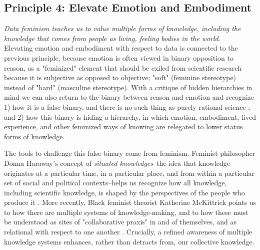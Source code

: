 \subsection{Principle 4: Elevate Emotion and Embodiment}

\textit{Data feminism teaches us to value multiple forms of knowledge, including the knowledge that comes from people as living, feeling bodies in the world.}
\\[5pt]
Elevating emotion and embodiment with respect to data is connected to the previous principle, because emotion is often viewed in binary opposition to reason, as a "feminized" element that should be exiled from scientific research because it is subjective as opposed to objective; "soft" (feminine stereotype) instead of "hard" (masculine stereotype). With a critique of hidden hierarchies in mind we can also return to the binary between reason and emotion and recognize 1) how it is a false binary, and there is no such thing as purely rational science \cite{Keller_1996}; and 2) how this binary is hiding a hierarchy, in which emotion, embodiment, lived experience, and other feminized ways of knowing are relegated to lower status forms of knowledge. 

The tools to challenge this false binary come from feminism. Feminist philosopher Donna Haraway’s concept of \textit{situated knowledges}–the idea that knowledge originates at a particular time, in a particular place, and from within a particular set of social and political contexts–helps us recognize how all knowledge, including scientific knowledge, is shaped by the perspectives of the people who produce it \cite{Haraway_1988}. More recently, Black feminist theorist Katherine McKittrick points us to how there are multiple systems of knowledge-making, and to how these must be understood as sites of "collaborative praxis" in and of themselves, and as relational with respect to one another \cite{McKittrick_2021}. Crucially, a refined awareness of multiple knowledge systems enhances, rather than detracts from, our collective knowledge. 

